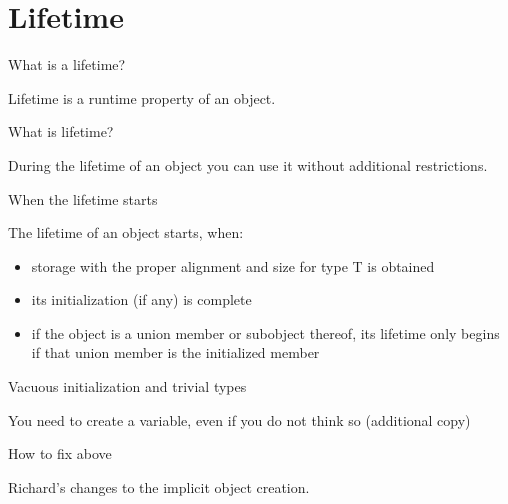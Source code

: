 \documentclass{panicsoftware-presentation}
\makeatletter
\newenvironment{itemizeSeq}{\begin{itemize}[<+-|alert@+>]}{\end{itemize}}
\makeatother
\begin{document}
\section*{Lifetime}

\begin{frame}{What is a lifetime?}

\centerline{Lifetime is a \alert{runtime} property of an object.}

\vfill
\centering

\end{frame}

\begin{frame}{What is lifetime?}

\centerline{During the lifetime of an object you can use it without additional restrictions.}

\end{frame}


\begin{frame}{When the lifetime starts}

\centerline{The lifetime of an object starts, when:}

\begin{itemizeSeq}

\item storage with the proper alignment and size for type T is obtained
\item its initialization \alert{(if any)} is complete
\item if the object is a union member or subobject thereof, its lifetime only begins if that union member is the initialized member

\end{itemizeSeq}
\end{frame}

\begin{frame}{Vacuous initialization and trivial types}

You need to create a variable, even if you do not think so (additional copy)

\end{frame}

\begin{frame}{How to fix above}

Richard's changes to the implicit object creation.

\end{frame}
\end{document}
